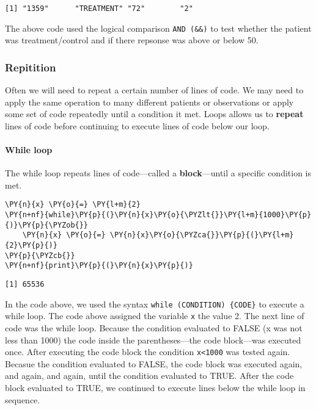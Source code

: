     \begin{Verbatim}[commandchars=\\\{\}]
[1] "1359"      "TREATMENT" "72"        "2"
    \end{Verbatim}

    The above code used the logical comparison \texttt{AND\ (\&\&)} to test
whether the patient was treatment/control and if there repsonse was
above or below 50.

    \hypertarget{repitition}{%
\subsubsection{Repitition}\label{repitition}}

Often we will need to repeat a certain number of lines of code. We may
need to apply the same operation to many different patients or
observations or apply some set of code repeatedly until a condition it
met. Loops allows us to \textbf{repeat} lines of code before continuing
to execute lines of code below our loop.

\hypertarget{while-loop}{%
\paragraph{While loop}\label{while-loop}}

The while loop repeats lines of code---called a \textbf{block}---until a
specific condition is met.

    \begin{tcolorbox}[breakable, size=fbox, boxrule=1pt, pad at break*=1mm,colback=cellbackground, colframe=cellborder]
\begin{Verbatim}[commandchars=\\\{\}]
\PY{n}{x} \PY{o}{=} \PY{l+m}{2}
\PY{n+nf}{while}\PY{p}{(}\PY{n}{x}\PY{o}{\PYZlt{}}\PY{l+m}{1000}\PY{p}{)}\PY{p}{\PYZob{}}
    \PY{n}{x} \PY{o}{=} \PY{n}{x}\PY{o}{\PYZca{}}\PY{p}{(}\PY{l+m}{2}\PY{p}{)}
\PY{p}{\PYZcb{}}
\PY{n+nf}{print}\PY{p}{(}\PY{n}{x}\PY{p}{)}
\end{Verbatim}
\end{tcolorbox}

    \begin{Verbatim}[commandchars=\\\{\}]
[1] 65536
    \end{Verbatim}

    In the code above, we used the syntax
\texttt{while\ (CONDITION)\ \{CODE\}} to execute a while loop. The code
above assigned the variable \texttt{x} the value 2. The next line of
code was the while loop. Because the condition evaluated to FALSE (x was
not less than 1000) the code inside the parentheses---the code
block---was executed once. After executing the code block the condition
\texttt{x\textless{}1000} was tested again. Becasue the condition
evaluated to FALSE, the code block was executed again, and again, and
again, until the condition evaluated to TRUE. After the code block
evaluated to TRUE, we continued to execute lines below the while loop in
sequence.

